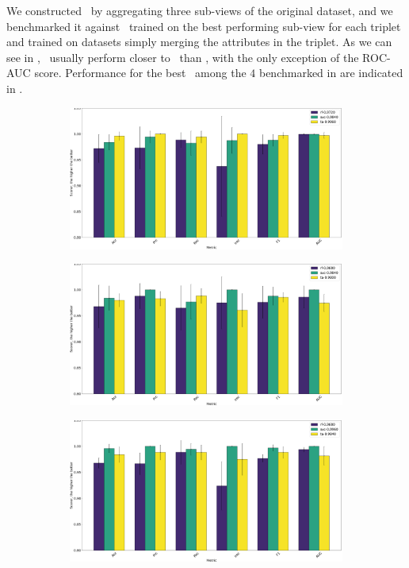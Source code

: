 We constructed \tas\ by aggregating three sub-views of the original dataset, and we benchmarked it
against \rfs\ trained on the best performing sub-view for each triplet and \svcs trained on
datasets simply merging the attributes in the triplet. As we can see in , \tas\ usually perform
closer to \svcs\ than \rfs, with the only exception of the ROC-AUC score. Performance for the best \ta\ among the $4$ benchmarked in  are indicated in .
\begin{figure}[!h]
	\centering
	\begin{subfigure}{0.49\linewidth}
		\includegraphics[width=\linewidth]{img/An_Bn_Cnmod_ta.png}
		\subcaption{\an, \bn, \cnmod}
	\end{subfigure}
	\begin{subfigure}{0.49\linewidth}
		\includegraphics[width=\linewidth]{img/An_Bn_Phi_ta.png}
		\subcaption{\an, \bn, \phin}
	\end{subfigure}
	\begin{subfigure}{0.49\linewidth}
		\includegraphics[width=\linewidth]{img/An_Cnmod_Phi_ta.png}

\end{subfigure}
\end{figure}
